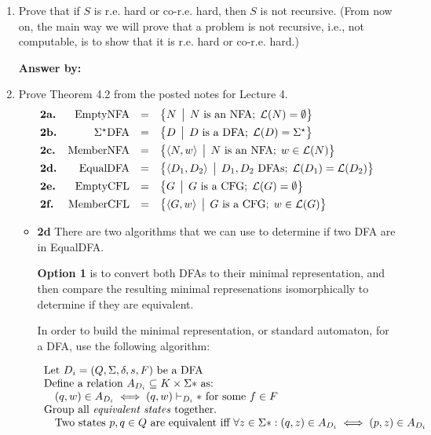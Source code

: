 \documentclass[12pt]{article}
\begin{document}
\noindent{}
\addtocounter{section}{1}

\begin{enumerate}
\item Prove that if $S$ is r.e. hard or co-r.e. hard, then $S$ is not recursive. (From now on, the main way we will
prove that a problem is not recursive, i.e., not computable, is to show that it is r.e. hard or co-r.e. hard.)

{\bf Answer by:} 

\item Prove Theorem 4.2 from the posted notes for Lecture 4.
\[
\begin{array}{lrcl}
\textbf{2a.}&\mbox{{\rm EmptyNFA}} &=& \bigl\{ N \,\bigm|\, N \mbox{ is an NFA};\; {\cal L}(N) = \emptyset \bigr\} \\[1ex]
\textbf{2b.}&\Sigma^\star\mbox{{\rm DFA}} &=& \bigl\{ D \,\bigm|\, D\mbox{ is a DFA};\;
  {\cal L}(D) = \Sigma^\star \bigr\}\\[1ex]
\textbf{2c.}&\mbox{{\rm MemberNFA}} &=& \bigl\{ \langle N,w \rangle \,\bigm|\, N \mbox{ is an NFA};\; w\in {\cal L}(N) \bigr\}\\[1ex]
\textbf{2d.}&\mbox{{\rm EqualDFA}} &=& \bigl\{ \langle D_1,D_2 \rangle \,\bigm|\, D_1,D_2 \mbox{ DFAs};\;{\cal L}(D_1) ={\cal L}(D_2) \bigr\}\\[1ex]
\textbf{2e.}&\mbox{{\rm EmptyCFL}} &=& \bigl\{ G \,\bigm|\, G \mbox{ is a CFG};\; {\cal L}(G) =
  \emptyset \bigr\} \\[1ex] 
\textbf{2f.}&\mbox{{\rm MemberCFL}} &=& \bigl\{ \langle G,w \rangle \,\bigm|\, G \mbox{ is a CFG};\;w\in{\cal L}(G) \bigr\}\\
\end{array}
\]

\begin{itemize}
\item \textbf{2d} There are two algorithms that we can use to determine if two DFA are in EqualDFA. 

\textbf{Option 1} is to convert both DFAs to their minimal representation, and then compare the resulting minimal represenations isomorphically to determine if they are equivalent. 

In order to build the minimal representation, or standard automaton, for a DFA, use the following algorithm:

\[
\begin{array}{l}
\textrm{Let $D_i = (Q, \Sigma, \delta, s, F)$ be a DFA} \\
\textrm{Define a relation $A_{D_i} \subseteq K \times \Sigma*$ as:} \\
\quad (q,w) \in A_{D_i} \iff (q,w) \vdash_{D_i}* \textrm{ for some } f \in F \\
\textrm{Group all \textit{equivalent states} together.} \\
\quad \textrm{Two states $p,q \in Q$ are equivalent iff } \forall z \in \Sigma*: (q,z) \in A_{D_i} \iff (p,z) \in A_{D_i} \\
\end{array}
\]


\end{itemize}
\end{enumerate}
\end{document}
